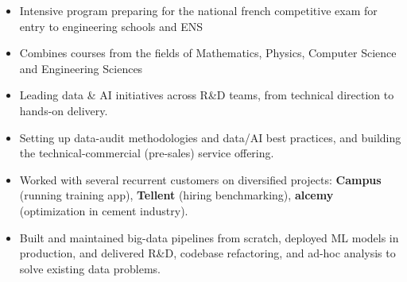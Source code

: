 \documentclass[10pt,a4paper]{altacv}
\begin{document}

\begin{itemize}
\item Intensive program preparing for the national french competitive exam for entry to engineering schools and ENS
\item Combines courses from the fields of Mathematics, Physics, Computer Science and Engineering Sciences
\end{itemize}
\divider









\begin{itemize}
\item Leading data \& AI initiatives across R\&D teams, from technical direction to hands-on delivery.
\item Setting up data-audit methodologies and data/AI best practices, and building the technical-commercial (pre-sales) service offering.
\end{itemize}

\divider


\begin{itemize}
\item Worked with several recurrent customers on diversified projects: \textbf{Campus} (running training app), \textbf{Tellent} (hiring benchmarking), \textbf{alcemy} (optimization in cement industry).
\item Built and maintained big-data pipelines from scratch, deployed ML models in production, and delivered R\&D, codebase refactoring, and ad-hoc analysis to solve existing data problems.
\end{itemize}
\end{document}
